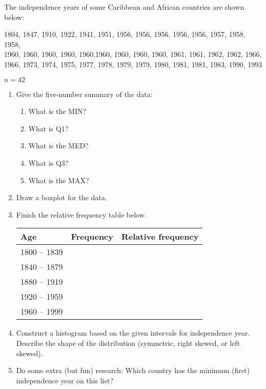 \documentclass[11pt]{book}\usepackage[]{graphicx}\usepackage[]{color}
\begin{document}
\begin{exercises}
\begin{exercise}
The independence years of some Caribbean and African countries are shown below:

1804, 1847, 1910, 1922, 1941, 1951, 1956, 1956, 1956, 1956, 1956, 1957, 1958, 1958,\\ 1960, 1960,  1960, 1960, 1960,1960, 1960, 1960, 1960, 1961, 1961, 1962, 1962, 1966, \\ 1966, 1973, 1974, 1975, 1977, 1978, 1979, 1979, 1980, 1981, 1981, 1983, 1990, 1993

$n = 42$

\begin{enumerate}
  \item Give the five-number summary of the data:
  {\small{
  \begin{enumerate}
  \item What is the MIN?
  \item What is Q1?
  \item What is the MED?
  \item What is Q3?
  \item What is the MAX?
\end{enumerate}
}}
\item Draw a boxplot for the data.
\item Finish the relative frequency table below.

{\small{
\begin{tabular}{@{} lcc @{}} \hline
Age & Frequency & Relative frequency \\ \hline
1800 – 1839 & & \\
1840 – 1879 & & \\
1880 – 1919	& & \\
1920 – 1959	& & \\
1960 – 1999	& & \\
\end{tabular}
}}
\item	Construct a histogram based on the given intervals for independence year. Describe the shape of the distribution (symmetric, right skewed, or left skewed).
\item Do some extra (but fun) research: Which country has the minimum (first) independence year on this list?
\end{enumerate}
\end{exercise}
\begin{solution}  %

\end{solution}

\clearpage

    \begin{exercise}  %


\end{exercise}
\end{exercises}
\end{document}
